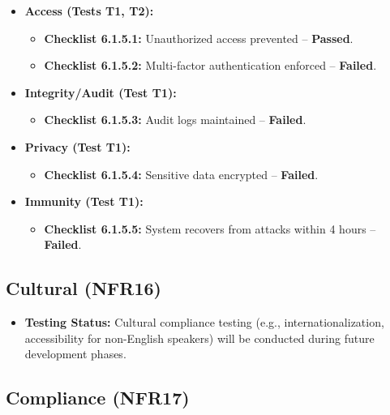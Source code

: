 \documentclass[12pt, titlepage]{article}
\begin{document}
\begin{itemize}
    \item \textbf{Access (Tests T1, T2):}  
    \begin{itemize}
        \item \textbf{Checklist 6.1.5.1:} Unauthorized access prevented – \textbf{Passed}.  
        \item \textbf{Checklist 6.1.5.2:} Multi-factor authentication enforced – \textbf{Failed}.  
    \end{itemize}
    
    \item \textbf{Integrity/Audit (Test T1):}  
    \begin{itemize}
        \item \textbf{Checklist 6.1.5.3:} Audit logs maintained – \textbf{Failed}.  
    \end{itemize}
    
    \item \textbf{Privacy (Test T1):}  
    \begin{itemize}
        \item \textbf{Checklist 6.1.5.4:} Sensitive data encrypted – \textbf{Failed}.  
    \end{itemize}
    
    \item \textbf{Immunity (Test T1):}  
    \begin{itemize}
        \item \textbf{Checklist 6.1.5.5:} System recovers from attacks within 4 hours – \textbf{Failed}.  
    \end{itemize}
\end{itemize}

\subsection{Cultural (NFR16)}  
\label{nfr16}

\begin{itemize}
    \item \textbf{Testing Status:} Cultural compliance testing (e.g., internationalization, accessibility for non-English speakers) will be conducted during future development phases.  
\end{itemize}

\subsection{Compliance (NFR17)}  
\label{nfr17}
\end{document}
